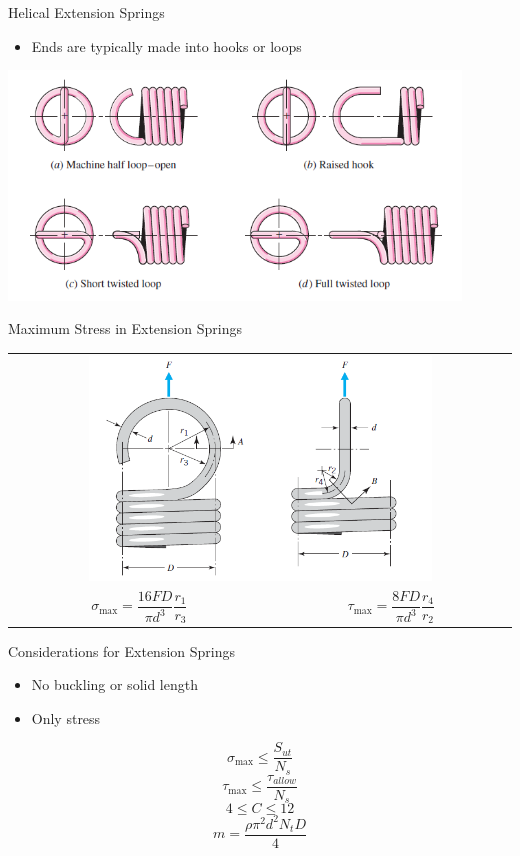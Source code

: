 \documentclass[10pt, svgnames]{beamer}
\begin{document}
\begin{frame}[label={sec:orgbaea788}]{Helical Extension Springs}
\begin{itemize}
\item Ends are typically made into hooks or loops
\end{itemize}


\centering
\includegraphics[width=0.9\textwidth]{pictures/extension-ends}
\end{frame}

\begin{frame}[label={sec:orgebaee61}]{Maximum Stress in Extension Springs}
\centering
\begin{tabular}[h]{cc}
  \multicolumn{2}{c}{\includegraphics[width=0.7\textwidth]{pictures/max-stress-hooks}} \\
  $ \sigma_{\max} = \dfrac{16FD}{\pi d^3}\dfrac{r_1}{r_3} $ & $ \tau_{\max} = \dfrac{8FD}{\pi d^3}\dfrac{r_4}{r_2} $
\end{tabular}
\end{frame}

\begin{frame}[label={sec:org8c7e53b}]{Considerations for Extension Springs}
\begin{itemize}
\item No buckling or solid length
\item Only stress
\end{itemize}


$$ \sigma_{\max} \leqslant \frac{S_{ut}}{N_s} $$
$$ \tau_{\max} \leqslant \frac{\tau_{allow}}{N_s} $$
$$ 4 \leqslant C \leqslant 12 $$
$$ m = \frac{\rho \pi^2 d^2 N_t D}{4} $$
\end{frame}
\end{document}

